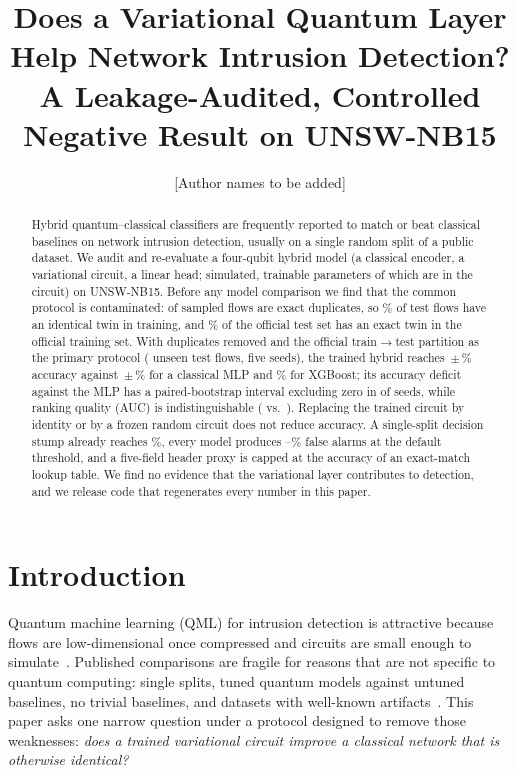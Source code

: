 \IfFileExists{IEEEtran.cls}{\documentclass[conference]{IEEEtran}}{\documentclass[10pt,twocolumn]{article}\usepackage[margin=0.8in]{geometry}}
\title{Does a Variational Quantum Layer Help Network Intrusion Detection? A Leakage-Audited, Controlled Negative Result on UNSW-NB15}
\author{[Author names to be added]}
\date{}
\begin{document}
\maketitle

\begin{abstract}
Hybrid quantum--classical classifiers are frequently reported to match or beat classical baselines on network intrusion detection, usually on a single random split of a public dataset. We audit and re-evaluate a four-qubit hybrid model (a classical encoder, a variational circuit, a linear head; simulated, \paramsHqnn{} trainable parameters of which \paramsVqc{} are in the circuit) on UNSW-NB15. Before any model comparison we find that the common protocol is contaminated: \sampleDupRows{} of \sampleRows{} sampled flows are exact duplicates, so \sampleTwinPct\% of test flows have an identical twin in training, and \offTestTwinPct\% of the official test set has an exact twin in the official training set. With duplicates removed and the official train$\to$test partition as the primary protocol (\offTestFinal{} unseen test flows, five seeds), the trained hybrid reaches \accHqnn\,$\pm$\,\accSdHqnn\% accuracy against \accMlp\,$\pm$\,\accSdMlp\% for a classical MLP and \accXgb\% for XGBoost; its accuracy deficit against the MLP has a paired-bootstrap interval excluding zero in \bootExcludeZero{} of \bootSeeds{} seeds, while ranking quality (AUC) is indistinguishable (\aucHqnn{} vs.\ \aucMlp{}). Replacing the trained circuit by identity or by a frozen random circuit does not reduce accuracy. A single-split decision stump already reaches \accStump\%, every model produces \fprXgb--\fprStump\% false alarms at the default threshold, and a five-field header proxy is capped at the accuracy of an exact-match lookup table. We find no evidence that the variational layer contributes to detection, and we release code that regenerates every number in this paper.
\end{abstract}

\section{Introduction}
Quantum machine learning (QML) for intrusion detection is attractive because flows are low-dimensional once compressed and circuits are small enough to simulate~\cite{schuld2020circuit,cerezo2021variational}. Published comparisons are fragile for reasons that are not specific to quantum computing: single splits, tuned quantum models against untuned baselines, no trivial baselines, and datasets with well-known artifacts~\cite{arp2022dos,engelen2021troubleshooting,bowles2024better}. This paper asks one narrow question under a protocol designed to remove those weaknesses: \emph{does a trained variational circuit improve a classical network that is otherwise identical?}
\end{document}
